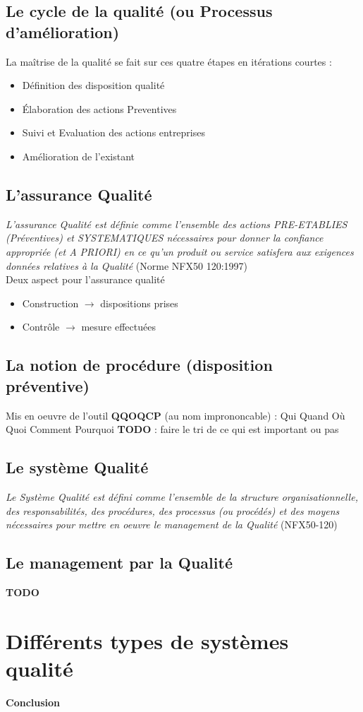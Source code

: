 	\subsection{Le cycle de la qualité (ou Processus d'amélioration)}
La maîtrise de la qualité se fait sur ces quatre étapes en itérations courtes : 
	\begin{itemize}
	\item Définition des disposition qualité
	\item Élaboration des actions Preventives
	\item Suivi et Evaluation des actions entreprises
	\item Amélioration de l’existant
	\end{itemize}

	\subsection{L'assurance Qualité}
\textit{L'assurance Qualité est définie comme l'ensemble des actions PRE-ETABLIES (Préventives) et SYSTEMATIQUES nécessaires pour donner la confiance appropriée (et A PRIORI) en ce qu'un produit ou service satisfera aux exigences données relatives à la Qualité} (Norme NFX50 120:1997)\\
Deux aspect pour l’assurance qualité
\begin{itemize}
\item Construction $\rightarrow$ dispositions prises
\item Contrôle $\rightarrow$ mesure effectuées
\end{itemize}



	\subsection{La notion de procédure (disposition préventive)}
Mis en oeuvre de l’outil \textbf{QQOQCP} (au nom imprononcable) : Qui Quand Où Quoi Comment Pourquoi
\textbf{TODO} : faire le tri de ce qui est important ou pas

	\subsection{Le système Qualité}
\textit{Le Système Qualité est défini comme l'ensemble de la structure organisationnelle,
des responsabilités, des procédures, des processus (ou procédés) et des moyens
nécessaires pour mettre en oeuvre le management de la Qualité }(NFX50-120)


	\subsection{Le management par la Qualité}
\textbf{TODO}

\section{Différents types de systèmes qualité}

\textbf{Conclusion}
